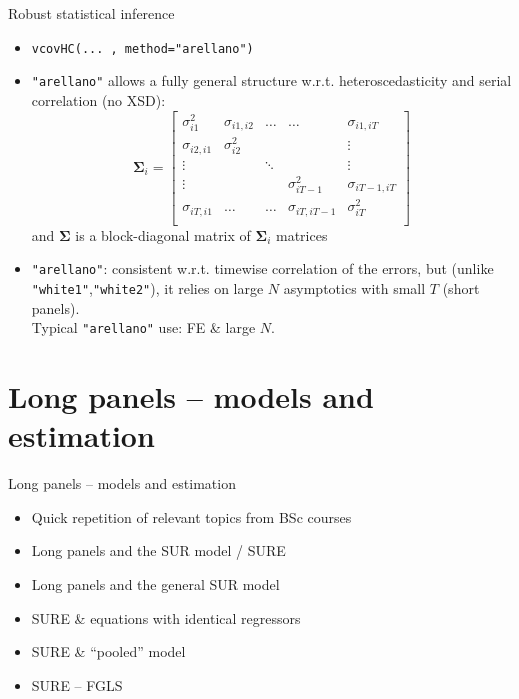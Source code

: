 \documentclass[usenames,dvipsnames]{beamer}
\begin{document}
\begin{frame}{Robust statistical inference}
\begin{itemize}
    \item \texttt{vcovHC(... , method="arellano")}
    \medskip
    \item \texttt{"arellano"} allows a fully general structure w.r.t. heteroscedasticity and serial correlation (no XSD):
    $$
    \bm{\Sigma}_i = 
    \begin{bmatrix}
    \sigma_{i1}^2 & \sigma_{i1,i2} & \dots & \dots & \sigma_{i1,iT} \\
    \sigma_{i2,i1} & \sigma_{i2}^2 &       &       & \vdots \\
    \vdots         &               & \ddots &      & \vdots \\
   \vdots         &               &  &  \sigma_{iT-1}^2    & \sigma_{iT-1,iT} \\
   \sigma_{iT,i1}       &   \dots & \dots    &  \sigma_{iT,iT-1}    & \sigma_{iT}^2 \\
    \end{bmatrix}
    $$
    and $\bm{\Sigma}$ is a block-diagonal matrix of $\bm{\Sigma}_i$ matrices
    \smallskip
    \item \texttt{"arellano"}: consistent w.r.t. timewise correlation of the errors, but (unlike \texttt{"white1"},\texttt{"white2"}), it relies on large $N$ asymptotics with small $T$ (short panels). \\ \medskip Typical \texttt{"arellano"} use: FE \& large $N$.
    \smallskip
\end{itemize}
\end{frame}
\section{Long panels -- models and estimation}
\begin{frame}{Long panels -- models and estimation}
    \begin{itemize}
        \item Quick repetition of relevant topics from BSc courses
        \bigskip
        \item Long panels and the SUR model / SURE
        \bigskip
        \item Long panels and the general SUR model
        \bigskip
        \item SURE \& equations with identical regressors
        \bigskip
        \item SURE \& ``pooled'' model
        \bigskip
        \item SURE -- FGLS
    \end{itemize}
\end{frame}
\end{document}

